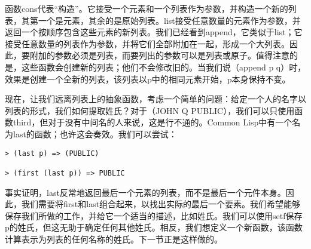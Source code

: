 函数cons代表“构造”。它接受一个元素和一个列表作为参数，并构造一个新的列表，其第一个是元素，其余的是原始列表。list接受任意数量的元素作为参数，并返回一个按顺序包含这些元素的新列表。我们已经看到append，它类似于list；它接受任意数量的列表作为参数，并将它们全部附加在一起，形成一个大列表。因此，要附加的参数必须是列表，而要列出的参数可以是列表或原子。值得注意的是，这些函数会创建新的列表；他们不会修改旧的。当我们说（append p q）时，效果是创建一个全新的列表，该列表以p中的相同元素开始，p本身保持不变。

现在，让我们远离列表上的抽象函数，考虑一个简单的问题：给定一个人的名字以列表的形式，我们如何提取姓氏？对于（JOHN Q PUBLIC），我们可以只使用函数third，但对于没有中间名的人来说，这是行不通的。Common Lisp中有一个名为last的函数；也许这会奏效。我们可以尝试：
\begin{lstlisting}[frame=shadowbox]
> (last p) => (PUBLIC)

> (first (last p)) => PUBLIC
\end{lstlisting}
事实证明，last反常地返回最后一个元素的列表，而不是最后一个元件本身。因此，我们需要将first和last组合起来，以找出实际的最后一个要素。我们希望能够保存我们所做的工作，并给它一个适当的描述，比如姓氏。我们可以使用setf保存p的姓氏，但这无助于确定任何其他姓氏。相反，我们想定义一个新函数，该函数计算表示为列表的任何名称的姓氏。下一节正是这样做的。